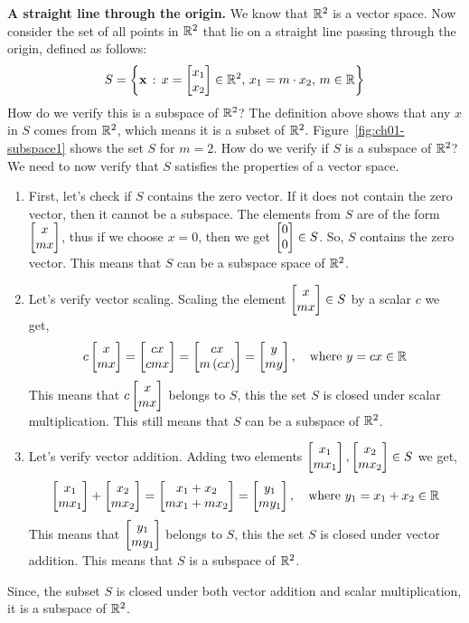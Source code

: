 \begin{boxedstuff}
\begin{example}
    \textbf{A straight line through the origin.} We know that $\mathbb{R}^2$ is a vector space. Now consider the set of all points in $\mathbb{R}^2$ that lie on a straight line passing through the origin, defined as follows:
    \[ S = \lc \mf{x} \, : \, x = \bmx x_1 \\ x_2 \emx \in \mb{R}^2, \, x_1 = m \cdot x_2, \, m \in \mb{R} \rc \]
    How do we verify this is a subspace of $\mathbb{R}^2$? The definition above shows that any $x$ in $S$ comes from $\mathbb{R}^2$, which means it is a subset of $\mathbb{R}^2$. Figure~\ref{fig:ch01-subspace1} shows the set $S$ for $m = 2$.
    \noindent How do we verify if $S$ is a subspace of $\mathbb{R}^2$? We need to now verify that $S$ satisfies the properties of a vector space.
    \begin{enumerate}
        \item First, let's check if $S$ contains the zero vector. If it does not contain the zero vector, then it cannot be a subspace. The elements from $S$ are of the form $\bmxc x \\ m x\emx$, thus if we choose $x = 0$, then we get $\bmx 0 \\ 0 \emx \in S$. So, $S$ contains the zero vector. This means that $S$ can be a subspace space of $\mathbb{R}^2$.
        \item Let's verify vector scaling. Scaling the element $\bmxc x \\ m x \emx \in S$ by a scalar $c$ we get,
        \[ c \bmxc x \\ m x\emx = \bmxc c x \\ c m x \emx = \bmxc c x \\ m \pp{c x} \emx = \bmxc y \\ m y\emx, \quad \text{where} \,\, y = c x \in \mb{R} \]
        This means that $c\bmxc x \\ m x\emx$ belongs to $S$, this the set $S$ is closed under scalar multiplication. This still means that $S$ can be a subspace of $\mathbb{R}^2$.
        \item Let's verify vector addition. Adding two elements $\bmxc x_1 \\ m x_1\emx, \bmxc x_2 \\ m x_2\emx \in S$ we get,
        \[ \bmxc x_1 \\ m x_1\emx + \bmxc x_2 \\ m x_2\emx = \bmxc x_1 + x_2 \\ m x_1 + m x_2 \emx = \bmxc y_1 \\ m y_1\emx, \quad \text{where} \,\, y_1 = x_1 + x_2 \in \mb{R} \]
        This means that $\bmxc y_1 \\ m y_1\emx$ belongs to $S$, this the set $S$ is closed under vector addition. This means that $S$ is a subspace of $\mathbb{R}^2$.
    \end{enumerate}
    Since, the subset $S$ is closed under both vector addition and scalar multiplication, it is a subspace of $\mathbb{R}^2$.
    \label{example:subspace-straight-line}
\end{example}
\end{boxedstuff}
